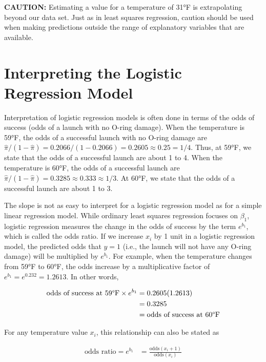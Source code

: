 \documentclass[
]{report}
\begin{document}
\large

\textbf{CAUTION:} Estimating a value for a temperature of 31°F is extrapolating beyond our data set. Just as in least squares regression, caution should be used when making predictions outside the range of explanatory variables that are available.
\normalsize

\hypertarget{interpreting-the-logistic-regression-model-1}{%
\section{\texorpdfstring{\textbf{Interpreting the Logistic Regression Model}}{Interpreting the Logistic Regression Model}}\label{interpreting-the-logistic-regression-model-1}}

Interpretation of logistic regression models is often done in terms of the odds of success (odds of a launch with no O-ring damage). When the temperature is 59°F, the odds of a successful launch with no O-ring damage are \(\hat\pi/(1 - \hat\pi) = 0.2066/(1 - 0.2066) = 0.2605 \approx 0.25 = 1/4\). Thus, at 59°F, we state that the odds of a successful launch are about 1 to 4. When the temperature is 60°F, the odds of a successful launch are \(\hat\pi/(1 - \hat\pi) = 0.3285 \approx 0.333 \approx 1/3\). At 60°F, we state that the odds of a successful launch are about 1 to 3.

The slope is not as easy to interpret for a logistic regression model as for a simple linear regression model. While ordinary least squares regression focuses on \(\beta_1\), logistic regression measures the change in the odds of success by the term \(e^{b_1}\), which is called the odds ratio. If we increase \(x_i\) by 1 unit in a logistic regression model, the predicted odds that \(y = 1\) (i.e., the launch will not have any O-ring damage) will be multiplied by \(e^{b_1}\). For example, when the temperature changes from 59°F to 60°F, the odds increase by a multiplicative factor of \(e^{b_1} = e^{0.232} = 1.2613\). In other words,

\begin{align}
\text{odds of success at 59°F} \times e^{b_1} 
&= 0.2605(1.2613) \notag \\
&= 0.3285 \notag \\
&= \text{odds of success at 60°F} \notag
\end{align}

For any temperature value \(x_i\), this relationship can also be stated as

\begin{align}
\text{odds ratio} = e^{b_1} &= \frac{\text{odds}(x_i + 1)}{\text{odds}(x_i)} \tag{7.10}
\end{align}
\end{document}

